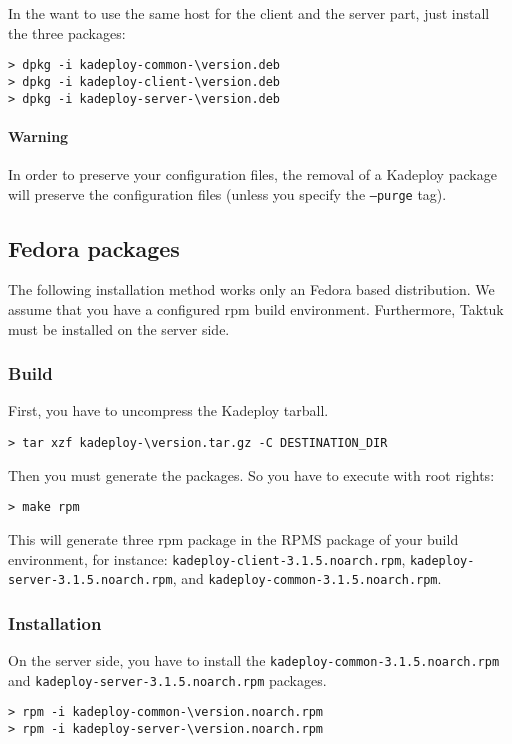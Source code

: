 \documentclass[a4wide,10pt,oneside]{book}
\newcommand{\version}{3.1.5}
\begin{document}
\noindent In the want to use the same host for the client and the server part, just install the three packages:
\begin{small}
\begin{Verbatim}[commandchars=\\\{\}]
> dpkg -i kadeploy-common-\version.deb
> dpkg -i kadeploy-client-\version.deb
> dpkg -i kadeploy-server-\version.deb
\end{Verbatim}
\end{small}

\paragraph{Warning}
In order to preserve your configuration files, the removal of a Kadeploy package will preserve the configuration files (unless you specify the \texttt{--purge} tag).

\subsection{Fedora packages}
The following installation method works only an Fedora based distribution. We assume that you have a configured rpm build environment. Furthermore, Taktuk must be installed on the server side.
\subsubsection{Build}
\noindent First, you have to uncompress the Kadeploy tarball. 
\begin{small}
\begin{Verbatim}[commandchars=\\\{\}]
> tar xzf kadeploy-\version.tar.gz -C DESTINATION_DIR
\end{Verbatim}
\end{small}

\noindent Then you must generate the packages. So you have to execute with root rights:
\begin{small}
\begin{verbatim}
> make rpm
\end{verbatim}
\end{small}
This will generate three rpm package in the RPMS package of your build environment, for instance: \texttt{kadeploy-client-\version.noarch.rpm}, \texttt{kadeploy-server-\version.noarch.rpm}, and \texttt{kadeploy-common-\version.noarch.rpm}.
\subsubsection{Installation}
\noindent On the server side, you have to install the \texttt{kadeploy-common-\version.noarch.rpm} and \texttt{kadeploy-server-\version.noarch.rpm} packages.
\begin{small}
\begin{Verbatim}[commandchars=\\\{\}]
> rpm -i kadeploy-common-\version.noarch.rpm
> rpm -i kadeploy-server-\version.noarch.rpm
\end{Verbatim}
\end{small}
\end{document}
